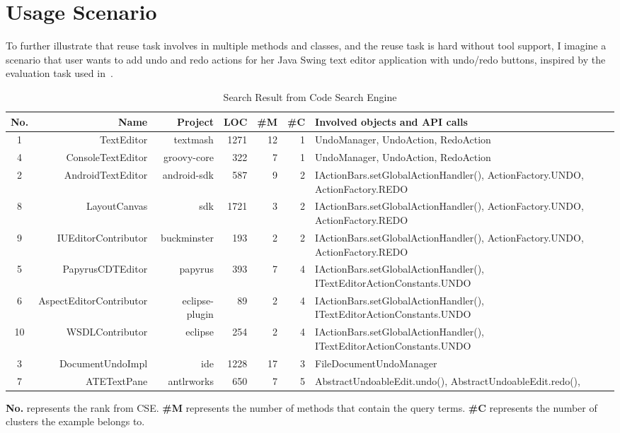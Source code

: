
\section{Usage Scenario}
 To further illustrate that reuse task involves in multiple methods and classes, and the reuse task is hard without tool support, I imagine a scenario that user wants to add undo and redo actions for her Java Swing text editor application with undo/redo buttons, inspired by the evaluation task used in~\cite{Murphy:nlConcern11}.
 

\begin{table*}[ht]
\begin{center}
\caption{Search Result from Code Search Engine}
\label{tab:total}
\scriptsize{
\begin{tabular*}{1\textwidth}{@{}c|rrrrrl@{}} \hline
No.&Name&Project&LOC&\#M&\#C&Involved objects and API calls\\\hline
1&TextEditor&textmash&1271&12&1&UndoManager, UndoAction, RedoAction\\
4&ConsoleTextEditor&groovy-core&322&7&1&UndoManager, UndoAction, RedoAction\\ \hline
2&AndroidTextEditor&android-sdk&587&9&2& IActionBars.setGlobalActionHandler(), ActionFactory.UNDO, ActionFactory.REDO\\
8&LayoutCanvas&sdk&1721&3&2& IActionBars.setGlobalActionHandler(), ActionFactory.UNDO, ActionFactory.REDO\\
9&IUEditorContributor&buckminster&193&2&2& IActionBars.setGlobalActionHandler(), ActionFactory.UNDO, ActionFactory.REDO\\ \hline
5&PapyrusCDTEditor&papyrus&393&7&4&IActionBars.setGlobalActionHandler(), ITextEditorActionConstants.UNDO\\
6&AspectEditorContributor&eclipse-plugin&89&2&4&IActionBars.setGlobalActionHandler(), ITextEditorActionConstants.UNDO\\
10&WSDLContributor&eclipse&254&2&4&IActionBars.setGlobalActionHandler(), ITextEditorActionConstants.UNDO\\ \hline
3&DocumentUndoImpl&ide&1228&17&3&FileDocumentUndoManager\\ \hline
7&ATETextPane&antlrworks&650&7&5&AbstractUndoableEdit.undo(), AbstractUndoableEdit.redo(),\\\hline
\end{tabular*}
 \label{tab:undoResult}
  {\bf No.} represents the rank from CSE. 
 \textbf{ \#M} represents the number of methods that contain the query terms.  \textbf{ \#C} represents the number of clusters the example belongs to.
}
 \end{center}
\end{table*}


